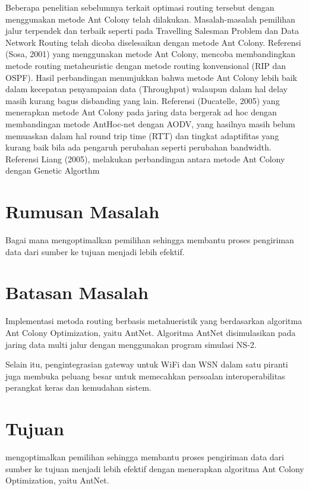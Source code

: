 \documentclass{jtetiproposalskripsi}
\begin{document}
Beberapa  penelitian  sebelumnya  terkait  optimasi routing  tersebut  dengan  menggunakan  metode  Ant Colony telah dilakukan. Masalah-masalah pemilihan jalur  terpendek  dan  terbaik  seperti  pada  Travelling Salesman Problem dan Data Network Routing  telah dicoba  diselesaikan  dengan  metode  Ant  Colony. Referensi  (Sosa,  2001)  yang menggunakan metode Ant  Colony,  mencoba  membandingkan  metode routing  metaheuristic  dengan  metode  routing konvensional  (RIP  dan OSPF). Hasil  perbandingan menunjukkan bahwa metode Ant Colony  lebih baik dalam  kecepatan  penyampaian  data  (Throughput) walaupun  dalam  hal  delay  masih  kurang  bagus 
disbanding  yang  lain.  Referensi  (Ducatelle,  2005) yang  menerapkan  metode  Ant  Colony  pada  jaring data bergerak ad hoc dengan membandingan metode AntHoc-net  dengan  AODV,  yang    hasilnya  masih belum memuaskan dalam hal round trip time (RTT) dan  tingkat  adaptifitas  yang  kurang  baik  bila  ada pengaruh  perubahan  seperti  perubahan  bandwidth. Referensi  Liang  (2005),  melakukan  perbandingan antara metode Ant  Colony  dengan  Genetic Algorthm



\section{Rumusan Masalah}
Bagai mana mengoptimalkan pemilihan  sehingga membantu proses pengiriman data dari                                                                    
sumber  ke  tujuan  menjadi  lebih  efektif.




\section{Batasan Masalah}
Implementasi metoda  routing berbasis metahueristik yang  berdasarkan  algoritma  Ant  Colony Optimization,  yaitu  AntNet.    Algoritma  AntNet disimulasikan  pada  jaring  data  multi  jalur  dengan menggunakan  program  simulasi  NS-2.

Selain itu, pengintegrasian gateway untuk WiFi dan WSN dalam satu piranti juga membuka peluang besar untuk memecahkan persoalan interoperabilitas perangkat keras dan kemudahan sistem.

\section{Tujuan}
mengoptimalkan pemilihan  sehingga membantu proses pengiriman data dari                                                                                                                                sumber  ke  tujuan  menjadi  lebih  efektif  dengan menerapkan algoritma  Ant  Colony Optimization,  yaitu  AntNet.
\end{document}
